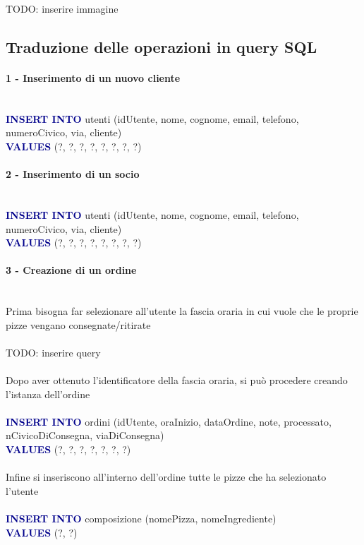 \documentclass[a4paper,12pt, oneside]{article}
\begin{document}
TODO: inserire immagine

\subsection{Traduzione delle operazioni in query SQL}

\paragraph{1 - Inserimento di un nuovo cliente}
\hphantom{A}\\    %
\textcolor{darkBlue}{\textbf{INSERT INTO}} utenti (idUtente, nome, cognome, email, telefono, numeroCivico, via, cliente)
\\\textcolor{darkBlue}{\textbf{VALUES}} (?, ?, ?, ?, ?, ?, ?, ?)

\paragraph{2 - Inserimento di un socio}
\hphantom{A}\\    %
\textcolor{darkBlue}{\textbf{INSERT INTO}} utenti (idUtente, nome, cognome, email, telefono, numeroCivico, via, cliente)
\\\textcolor{darkBlue}{\textbf{VALUES}} (?, ?, ?, ?, ?, ?, ?, ?)

\paragraph{3 - Creazione di un ordine}
\hphantom{A}\\    %
Prima bisogna far selezionare all'utente la fascia oraria in cui vuole che le proprie pizze vengano consegnate/ritirate
\\\\
TODO: inserire query
\\\\
Dopo aver ottenuto l'identificatore della fascia oraria, si può procedere creando l'istanza dell'ordine
\\\\
\textcolor{darkBlue}{\textbf{INSERT INTO}} ordini (idUtente, oraInizio, dataOrdine, note, processato, nCivicoDiConsegna, viaDiConsegna)
\\\textcolor{darkBlue}{\textbf{VALUES}} (?, ?, ?, ?, ?, ?, ?)
\\\\
Infine si inseriscono all'interno dell'ordine tutte le pizze che ha selezionato l'utente
\\\\
\textcolor{darkBlue}{\textbf{INSERT INTO}} composizione (nomePizza, nomeIngrediente)
\\\textcolor{darkBlue}{\textbf{VALUES}} (?, ?)
\end{document}
